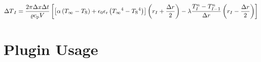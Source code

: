 \documentclass{scrartcl}
\begin{document}
    \begin{equation}
        {\Delta T}_{I} = \frac{2 \pi {\Delta x} {\Delta t}}{{\varrho}{c_\mathrm{p}}{V}} \left[
            \left[ {\alpha} \left( {T_\infty} - {T_\mathrm{S}} \right) + {\epsilon_0}{\epsilon_\mathrm{r}}\left( {T_\infty}^4 - {T_\mathrm{S}}^4 \right) \right] \left( {r}_{I} + \frac{{\Delta r}}{2} \right)
            -{\lambda}\frac{{T}_{{I}}^{n} - {T}_{{I}-1}^{n}}{{\Delta r}}\left( {r}_{I} - \frac{{\Delta r}}{2} \right)\right]
        \label{eq:increment_surface}
    \end{equation}


    \section{Plugin Usage}\label{sec:plugin-usage}

    

    \printbibliography
\end{document}
